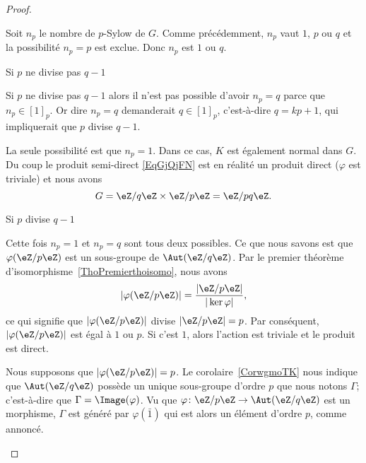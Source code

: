 \begin{proof}
\begin{subproof}
        Soit \( n_p\) le nombre de \( p\)-Sylow de \( G\). Comme précédemment, \( n_p\) vaut \( 1\), \( p\) ou \( q\) et la possibilité \( n_p=p\) est exclue. Donc \( n_p\) est \( 1\) ou \( q\).

    \item[Si \( p\) ne divise pas \( q-1\)]

        Si \( p\) ne divise pas \( q-1\) alors il n'est pas possible d'avoir \( n_p=q\) parce que \( n_p\in [1]_p\). Or dire \( n_p=q\) demanderait \( q\in [1]_p\), c'est-à-dire \( q=kp+1\), qui impliquerait que \( p\) divise \( q-1\).

        La seule possibilité est que \( n_p=1\). Dans ce cas, \( K\) est également normal dans \( G\). Du coup le produit semi-direct \eqref{EqGjQjFN} est en réalité un produit direct (\( \varphi\) est triviale) et nous avons
        \begin{equation}
            G=\eZ/q\eZ\times \eZ/p\eZ=\eZ/pq\eZ.
        \end{equation}

    \item[Si \( p\) divise \( q-1\)]

        Cette fois \( n_p=1\) et \( n_p=q\) sont tous deux possibles. Ce que nous savons est que \( \varphi(\eZ/p\eZ)\) est un sous-groupe de \( \Aut(\eZ/q\eZ)\). Par le premier théorème d'isomorphisme~\ref{ThoPremierthoisomo}, nous avons
        \begin{equation}
            | \varphi(\eZ/p\eZ) |=\frac{ | \eZ/p\eZ | }{ | \ker\varphi | },
        \end{equation}
        ce qui signifie que \( | \varphi(\eZ/p\eZ) |\) divise \( | \eZ/p\eZ |=p\). Par conséquent, \( | \varphi(\eZ/p\eZ) |\) est égal à \( 1\) ou \( p\). Si c'est \( 1\), alors l'action est triviale et le produit est direct.

        Nous supposons que \( | \varphi(\eZ/p\eZ) |=p\). Le corolaire~\ref{CorwgmoTK} nous indique que \( \Aut(\eZ/q\eZ)\) possède un unique sous-groupe d'ordre \( p\) que nous notons \( \Gamma\); c'est-à-dire que \( \Gamma=\Image(\varphi)\). Vu que \( \varphi\colon \eZ/p\eZ\to \Aut(\eZ/q\eZ)\) est un morphisme, \( \Gamma\) est généré par \( \varphi(\bar 1)\) qui est alors un élément d'ordre \( p\), comme annoncé.


\end{subproof}
\end{proof}
